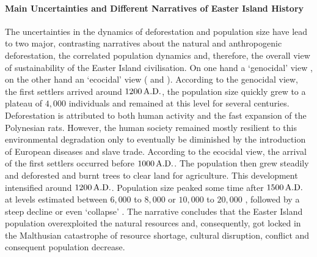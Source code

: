 \paragraph{Main Uncertainties and Different Narratives of Easter Island History}
The uncertainties in the dynamics of deforestation and population size have lead to two major, contrasting narratives about the natural and anthropogenic deforestation, the correlated population dynamics and, therefore, the overall view of sustainability of the Easter Island civilisation.
On one hand a `genocidal' view \citep{Hunt2007}, on the other hand an `ecocidal' view (\citet{Diamond2011} and \citet{Bahn2017}).
According to the genocidal view, the first settlers arrived around $1200\,{\rm A.D.}$, the population size quickly grew to a plateau of $4,000$ individuals and remained at this level for several centuries. Deforestation is attributed to both human activity and the fast expansion of the Polynesian rats. 
However, the human society remained mostly resilient to this environmental degradation only to eventually be diminished by the introduction of European diseases and slave trade. 
According to the ecocidal view, the arrival of the first settlers occurred before $1000\, {\rm A.D.}$. 
The population then grew steadily and deforested and burnt trees to clear land for agriculture. This development intensified around $1200\, {\rm A.D.}$. 
Population size peaked some time after $1500\, {\rm A.D.}$ at levels estimated between $6,000$ to $8,000$ or $10,000$ to $20,000$ \citep{Bahn2017}, followed by a steep decline or even `collapse' \citep{Diamond2011}.
The narrative concludes that the Easter Island population overexploited the natural resources and, consequently, got locked in the Malthusian catastrophe of resource shortage, cultural disruption, conflict and consequent population decrease.
